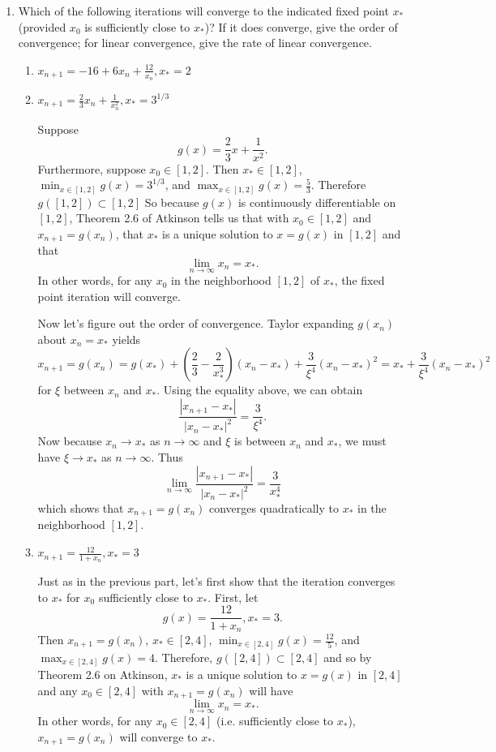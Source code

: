 \documentclass[a4paper,12pt]{article}
\newcommand{\abs}[1]{\left| #1 \right|}
\begin{document}
	\begin{enumerate}[label = \arabic*.]
		\item Which of the following iterations will converge to the indicated fixed point $ x_* $ (provided $ x_0 $ is sufficiently close to $ x_* $)? If it does converge, give the order of convergence; for linear convergence, give the rate of linear convergence.
		
		\begin{enumerate}[label = \roman*.]
			\item $ x_{n+1} = -16 + 6x_n + \frac{12}{x_n}, x_*= 2$
			
			\item $ x_{n+1} = \frac{2}{3} x_n + \frac{1}{x_n^2}, x_* = 3^{1/3}$
			
			Suppose 
			\[
				g(x) = \frac{2}{3}x + \frac{1}{x^2}.
			\]
			Furthermore, suppose $ x_0 \in [1,2] $. Then $ x_* \in [1,2] $,  $ \min_{x \in [1,2]} g(x) = 3^{1/3} $, and $ \max_{x \in [1,2]}g(x) = \frac{5}{3} $. Therefore $ g([1,2]) \subset [1,2]$ So because $ g(x) $ is continuously differentiable on $ [1,2] $, Theorem 2.6 of Atkinson tells us that with $ x_0 \in [1,2] $ and $ x_{n+1} = g(x_n)$, that $ x_* $ is a unique solution to $ x = g(x) $ in $ [1,2] $ and that
			\[
				\lim_{n \to \infty} x_n = x_*.
			\]
			In other words, for any $ x_0 $ in the neighborhood $ [1,2] $ of $ x_* $, the fixed point iteration will converge.
			
			Now let's figure out the order of convergence. Taylor expanding $ g(x_n) $ about $ x_n = x_* $ yields
			\[
				x_{n+1} = g(x_n) = g(x_*) + \left(\frac{2}{3} - \frac{2}{x_*^3}\right)(x_n - x_*) + \frac{3}{\xi^4}(x_n - x_*)^2 = x_* + \frac{3}{\xi^4}(x_n - x_*)^2
			\]
			 for $ \xi $ between $ x_n $ and $ x_* $. Using the equality above, we can obtain
			\[
				\frac{\abs{x_{n+1} - x_*}}{\abs{x_n - x_*}^2} = \frac{3}{\xi^4}.
			\]
			Now because $ x_n \to x_* $ as $ n \to \infty $ and $ \xi $ is between $ x_n $ and $ x_* $, we must have $ \xi \to x_* $ as $ n \to \infty $. Thus
			\[
				\lim_{n \to \infty} \frac{\abs{x_{n+1} - x_*}}{\abs{x_n - x_*}^2} = \frac{3}{x_*^4}
			\]
			which shows that $ x_{n+1} = g(x_n) $ converges quadratically to $ x_* $ in the neighborhood $ [1,2] $.
			
			
			\item $ x_{n+1} = \frac{12}{1+x_n}, x_* = 3 $
			
			Just as in the previous part, let's first show that the iteration converges to $ x_* $ for $ x_0 $ sufficiently close to $ x_* $. First, let
			\[
				g(x) = \frac{12}{1+x_n}, x_* = 3.
			\]
			Then $ x_{n+1} = g(x_n) $, $ x_* \in [2,4] $, $ \min_{x \in [2,4]}g(x) = \frac{12}{5} $, and $ \max_{x \in [2,4]} g(x) = 4$. Therefore, $ g([2,4]) \subset [2,4] $ and so by Theorem 2.6 on Atkinson, $ x_* $ is a unique solution to $ x = g(x) $ in $ [2,4] $ and any $ x_0 \in [2,4] $ with $ x_{n+1} = g(x_n)$ will have
			\[
				\lim_{n \to \infty}x_n = x_*.
			\]
			In other words, for any $ x_0 \in [2,4] $ (i.e. sufficiently close to $ x_* $), $ x_{n+1} = g(x_n) $ will converge to $ x_* $.
			

\end{enumerate}
\end{enumerate}
\end{document}

